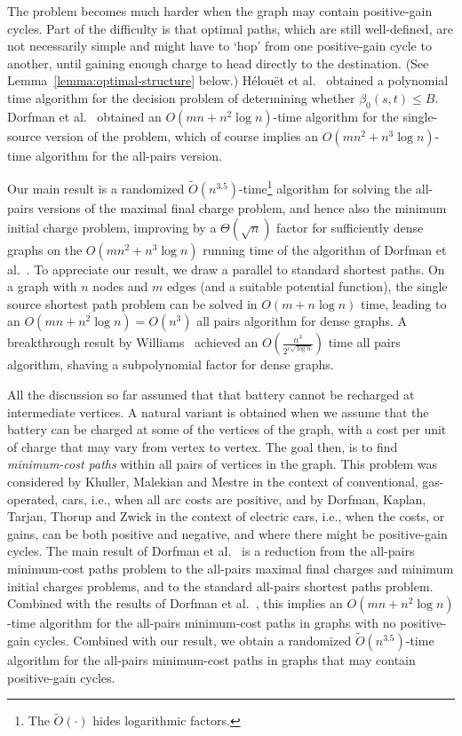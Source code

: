 \documentclass[11pt]{article}
\begin{document}
The problem becomes much harder when the graph may contain positive-gain cycles. Part of the difficulty is that optimal paths, which are still well-defined, are not necessarily simple and might have to `hop' from one positive-gain cycle to another, until gaining enough charge to head directly to the destination. (See Lemma~\ref{lemma:optimal-structure} below.)
H\'{e}lou\"{e}t et al.~\cite{helouet2019reachability} obtained a polynomial time algorithm for the decision problem of determining whether $\beta_0(s,t) \le B$.
Dorfman et al.~\cite{DorfmanKTZ23} obtained an $O(mn+n^2\log n)$-time algorithm for the single-source version of the problem, which of course implies an $O(mn^2+n^3\log n)$-time algorithm for the all-pairs version. 

Our main result is a randomized $\tilde{O}(n^{3.5})$-time\footnote{The $\tilde{O}(\cdot)$ hides logarithmic factors.} algorithm for solving the all-pairs versions of the maximal final charge problem, and hence also the minimum initial charge problem, improving by a $\Theta(\sqrt{n})$ factor for sufficiently dense graphs on the $O(mn^2+n^3\log n)$ running time of the algorithm of Dorfman et al.~\cite{DorfmanKTZ23}. To appreciate our result, we draw a parallel to standard shortest paths. On a graph with $n$ nodes and $m$ edges (and a suitable potential function), the single source shortest path problem can be solved in $O(m + n\log n)$ time, leading to an $O(mn+n^2 \log n) = O(n^3)$ all pairs algorithm for dense graphs. A breakthrough result by Williams~\cite{williams2014faster} achieved an $O(\frac{n^3}{2^{c\sqrt{\log n}}})$ time all pairs algorithm, shaving a subpolynomial factor for dense graphs.

All the discussion so far assumed that that battery cannot be recharged at intermediate vertices. A natural variant is obtained when we assume that the battery can be charged at some of the vertices of the graph, with a cost per unit of charge that may vary from vertex to vertex. The goal then, is to find \emph{minimum-cost paths} within all pairs of vertices in the graph. This problem was considered by Khuller, Malekian and Mestre \cite{khuller2011fill} in the context of conventional, gas-operated, cars, i.e., when all arc costs are positive, and by Dorfman, Kaplan, Tarjan, Thorup and Zwick \cite{DKTTZ24} in the context of electric cars, i.e., when the costs, or gains, can be both positive and negative, and where there might be positive-gain cycles. The main result of Dorfman et al.~\cite{DKTTZ24} is a reduction from the all-pairs minimum-cost paths problem to the all-pairs maximal final charges and minimum initial charges problems, and to the standard all-pairs shortest paths problem. Combined with the results of Dorfman et al.~\cite{DorfmanKTZ23}, this implies an $O(mn+n^2\log n)$-time algorithm for the all-pairs minimum-cost paths in graphs with no positive-gain cycles. Combined with our result, we obtain a randomized $\tilde{O}(n^{3.5})$-time algorithm for the all-pairs minimum-cost paths in graphs that may contain positive-gain cycles.
\end{document}
